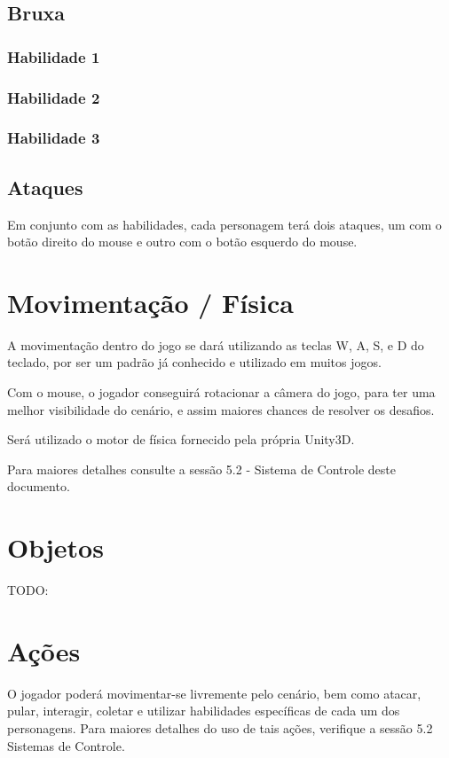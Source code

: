 \subsection{Bruxa}

\subsubsection{Habilidade 1}

\subsubsection{Habilidade 2}

\subsubsection{Habilidade 3}


\subsection{Ataques}
Em conjunto com as habilidades, cada personagem terá dois ataques, um com o botão direito do mouse e outro com o botão esquerdo do mouse. 


\section{Movimentação / Física}
A movimentação dentro do jogo se dará utilizando as teclas W, A, S, e D do teclado, por ser um padrão já conhecido e utilizado em muitos jogos.

Com o mouse, o jogador conseguirá rotacionar a câmera do jogo, para ter uma melhor visibilidade do cenário, e assim maiores chances de resolver os desafios.

Será utilizado o motor de física fornecido pela própria Unity3D.

Para maiores detalhes consulte a sessão 5.2 - Sistema de Controle deste documento.

\section{Objetos}

TODO:

\section{Ações}
O jogador poderá movimentar-se livremente pelo cenário, bem como atacar, pular, interagir, coletar e utilizar habilidades específicas de cada um dos personagens. Para maiores detalhes do uso de tais ações, verifique  a sessão 5.2 Sistemas de Controle.

